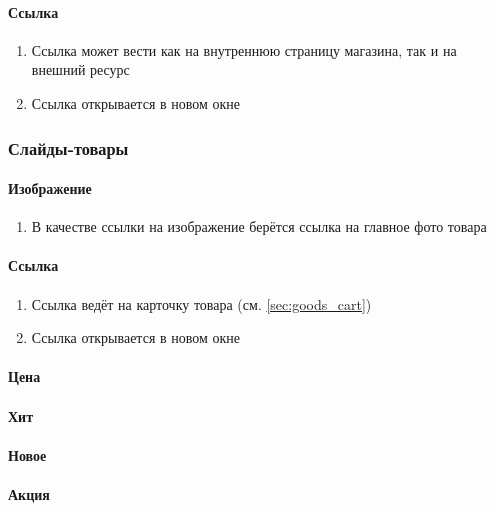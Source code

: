                 \paragraph{Ссылка}

                    \begin{enumerate}
                        \item Ссылка может вести как на внутреннюю страницу магазина, так и на внешний ресурс
                        \item Ссылка открывается в новом окне
                    \end{enumerate}
               
            \subsubsection{Слайды-товары}
                \paragraph{Изображение}
                    \begin{enumerate}
                        \item В качестве ссылки на изображение берётся ссылка на главное фото товара
                    \end{enumerate}
                \paragraph{Ссылка}
                    \begin{enumerate}
                        \item Ссылка ведёт на карточку товара (см. \ref{sec:goods_cart})
                        \item Ссылка открывается в новом окне
                    \end{enumerate}
                \paragraph{Цена}
                \paragraph{Хит}
                \paragraph{Новое}
                \paragraph{Акция}
